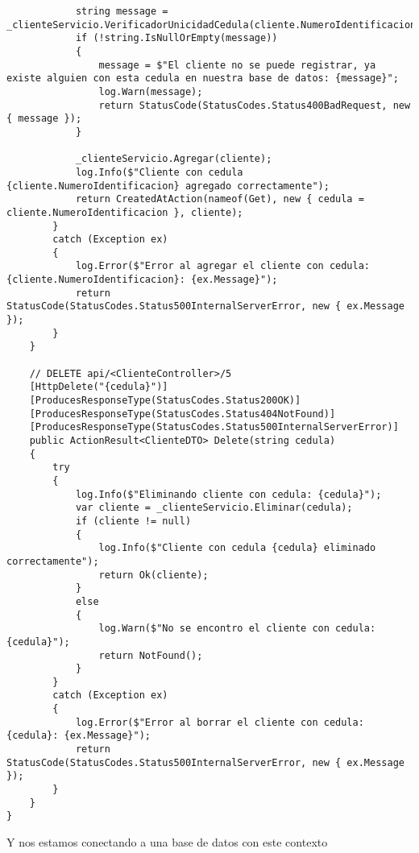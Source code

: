 \documentclass[executivepaper]{article}
\begin{document}
\begin{lstlisting}
            string message = _clienteServicio.VerificadorUnicidadCedula(cliente.NumeroIdentificacion);
            if (!string.IsNullOrEmpty(message))
            {
                message = $"El cliente no se puede registrar, ya existe alguien con esta cedula en nuestra base de datos: {message}";
                log.Warn(message);
                return StatusCode(StatusCodes.Status400BadRequest, new { message });
            }

            _clienteServicio.Agregar(cliente);
            log.Info($"Cliente con cedula {cliente.NumeroIdentificacion} agregado correctamente");
            return CreatedAtAction(nameof(Get), new { cedula = cliente.NumeroIdentificacion }, cliente);
        }
        catch (Exception ex)
        {
            log.Error($"Error al agregar el cliente con cedula: {cliente.NumeroIdentificacion}: {ex.Message}");
            return StatusCode(StatusCodes.Status500InternalServerError, new { ex.Message });
        }
    }

    // DELETE api/<ClienteController>/5
    [HttpDelete("{cedula}")]
    [ProducesResponseType(StatusCodes.Status200OK)]
    [ProducesResponseType(StatusCodes.Status404NotFound)]
    [ProducesResponseType(StatusCodes.Status500InternalServerError)]
    public ActionResult<ClienteDTO> Delete(string cedula)
    {
        try
        {
            log.Info($"Eliminando cliente con cedula: {cedula}");
            var cliente = _clienteServicio.Eliminar(cedula);
            if (cliente != null)
            {
                log.Info($"Cliente con cedula {cedula} eliminado correctamente");
                return Ok(cliente);
            }
            else
            {
                log.Warn($"No se encontro el cliente con cedula: {cedula}");
                return NotFound();
            }
        }
        catch (Exception ex)
        {
            log.Error($"Error al borrar el cliente con cedula: {cedula}: {ex.Message}");
            return StatusCode(StatusCodes.Status500InternalServerError, new { ex.Message });
        }
    }
}
\end{lstlisting}

Y nos estamos conectando a una base de datos con este contexto
\end{document}
